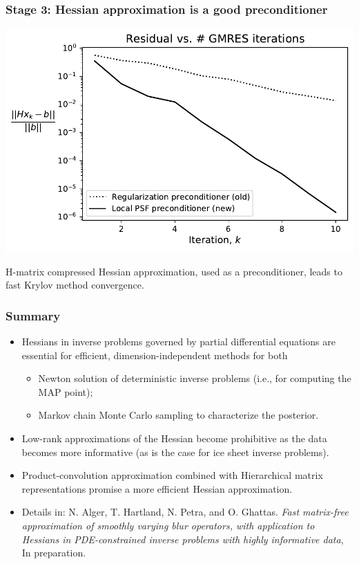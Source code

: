 \documentclass[10pt,final,xcolor=dvipsnames]{beamer}
\begin{document}
\begin{frame}
	\frametitle{Stage 3: Hessian approximation is a good preconditioner}
	\begin{center}
		\includegraphics[width=0.75\columnwidth]{extraplots/ice_gmres_convergence.pdf}
	\end{center}
\begin{center}
	H-matrix compressed Hessian approximation, used as a preconditioner, leads to fast Krylov method convergence.
\end{center}
\end{frame}
\begin{frame}
  \frametitle{Summary}

  \begin{itemize}
  \item Hessians in inverse problems governed by
    partial differential equations are essential for
    efficient, dimension-independent methods for both
    \begin{itemize}
    \item Newton solution of deterministic inverse problems (i.e., for
      computing the MAP point);
      \vspace{0.05in}
    \item Markov chain Monte Carlo sampling to characterize the
      posterior.
    \end{itemize}
    \vspace{0.05in}
  \item Low-rank approximations of the Hessian become
    prohibitive as the data becomes more informative (as is the case
    for ice sheet inverse problems).
    \vspace{0.05in}
  \item Product-convolution approximation combined with Hierarchical matrix representations promise a more efficient
    Hessian approximation.
  \end{itemize}
    \vspace{0.2in}
  \begin{itemize}
  \item [] \scriptsize{Details in: N. Alger, T. Hartland, N. Petra,
    and O. Ghattas. {\em Fast matrix-free approximation of smoothly
      varying blur operators, with application to Hessians in
      PDE-constrained inverse problems with highly informative data},
    In preparation.}
  \end{itemize}
\end{frame}
\end{document}
